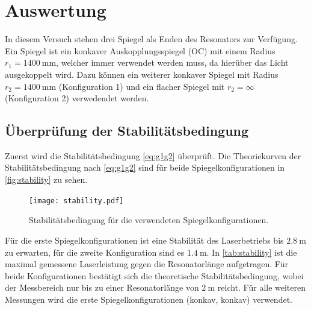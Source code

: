 \section{Auswertung}
\label{sec:Auswertung}
In diesem Versuch stehen drei Spiegel als Enden des Resonators zur Verfügung. Ein Spiegel ist ein konkaver Auskopplungsspiegel (OC) mit einem Radius 
$r_1 = \qty{1400}{\milli\metre}$, welcher immer verwendet werden muss, da hierüber das Licht ausgekoppelt wird.
Dazu können ein weiterer konkaver Spiegel mit Radius $r_2 = \qty{1400}{\milli\metre}$ (Konfiguration 1) und ein flacher Spiegel mit $r_2 = \infty$ (Konfiguration 2) verwedendet werden.
\subsection{Überprüfung der Stabilitätsbedingung}
Zuerst wird die Stabilitätsbedingung \eqref{eq:g1g2} überprüft.
Die Theoriekurven der Stabilitätsbedingung nach \autoref{eq:g1g2} sind für beide Spiegelkonfigurationen in \autoref{fig:stability} zu sehen.
\begin{figure}
  \centering
  \texttt{[image: stability.pdf]}
  \caption{Stabilitätsbedingung für die verwendeten Spiegelkonfigurationen.}
  \label{fig:stability}
\end{figure}
Für die erste Spiegelkonfigurationen ist eine Stabilität des Laserbetriebs bis $\qty{2.8}{\metre}$ zu erwarten, für die zweite Konfiguration sind es $\qty{1.4}{\metre}$.
In \autoref{tab:stability} ist die maximal gemessene Laserleistung gegen die Resonatorlänge aufgetragen. Für beide Konfigurationen bestätigt sich die theoretische 
Stabilitätsbedingung, wobei der Messbereich nur bis zu einer Resonatorlänge von $\qty{2}{\metre}$ reicht.
Für alle weiteren Messungen wird die erste Spiegelkonfigurationen (konkav, konkav) verwendet.
